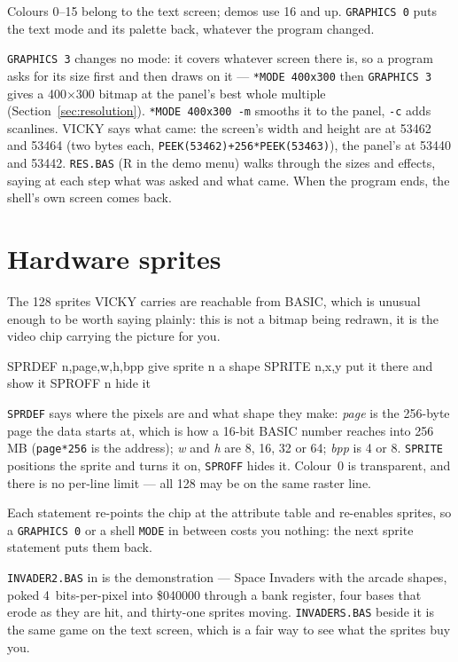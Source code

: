 Colours 0--15 belong to the text screen; demos use 16 and up. \verb|GRAPHICS 0|
puts the text mode and its palette back, whatever the program changed.

\verb|GRAPHICS 3| changes no mode: it covers whatever screen there is, so a
program asks for its size first and then draws on it ---
\verb|*MODE 400x300| then \verb|GRAPHICS 3| gives a 400$\times$300 bitmap at
the panel's best whole multiple (Section~\ref{sec:resolution}).
\verb|*MODE 400x300 -m| smooths it to the panel, \verb|-c| adds scanlines.
VICKY says what came: the screen's width and height are at 53462 and 53464
(two bytes each, \verb|PEEK(53462)+256*PEEK(53463)|), the panel's at 53440
and 53442. \verb|RES.BAS| (R in the demo menu) walks through the sizes and
effects, saying at each step what was asked and what came. When the program
ends, the shell's own screen comes back.

\section{Hardware sprites}
The 128 sprites VICKY carries are reachable from BASIC, which is unusual
enough to be worth saying plainly: this is not a bitmap being redrawn, it
is the video chip carrying the picture for you.

\begin{type}
SPRDEF n,page,w,h,bpp   give sprite n a shape
SPRITE n,x,y            put it there and show it
SPROFF n                hide it
\end{type}

\verb|SPRDEF| says where the pixels are and what shape they make:
\emph{page} is the 256-byte page the data starts at, which is how a
16-bit BASIC number reaches into 256\,MB (\verb|page*256| is the
address); \emph{w} and \emph{h} are 8, 16, 32 or 64; \emph{bpp} is 4 or
8. \verb|SPRITE| positions the sprite and turns it on, \verb|SPROFF|
hides it. Colour~0 is transparent, and there is no per-line limit --- all
128 may be on the same raster line.

Each statement re-points the chip at the attribute table and re-enables
sprites, so a \verb|GRAPHICS 0| or a shell \verb|MODE| in between costs
you nothing: the next sprite statement puts them back.

\verb|INVADER2.BAS| in  is the demonstration --- Space
Invaders with the arcade shapes, poked 4~bits-per-pixel into \$040000
through a bank register, four bases that erode as they are hit, and
thirty-one sprites moving. \verb|INVADERS.BAS| beside it is the same
game on the text screen, which is a fair way to see what the sprites buy
you.

